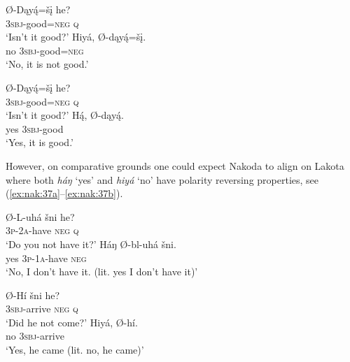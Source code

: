 \documentclass[output=paper,colorlinks,citecolor=brown]{langscibook}
\begin{document}
\ea\label{ex:nak:36a}
    \begin{xlist}[Q: ]
        \gll Ø-Dąy\'{ą}=šį he?  \\
             \textsc{3sbj}-good=\textsc{neg} \textsc{q}  \\
        \glt ‘Isn’t it good?’
        \gll Hiyá, Ø-dąy\'{ą}=šį. \\
              no \textsc{3sbj}-good=\textsc{neg} \\
        \glt ‘No, it is not good.’
    \end{xlist} 
\z 
\ea\label{ex:nak:36b}
    \begin{xlist}[Q: ]
        \gll Ø-Dąy\'{ą}=šį he? \\
             \textsc{3sbj}-good=\textsc{neg} \textsc{q} \\
        \glt ‘Isn’t it good?’
        \gll H\'{ą}, Ø-dąy\'{ą}. \\
              yes \textsc{3sbj}-good\\
        \glt ‘Yes, it is good.’
    \end{xlist}
\z 

However, on comparative grounds one could expect Nakoda to align on Lakota where both \textit{háŋ} ‘yes’ and \textit{hiyá} ‘no’ have polarity reversing properties, see (\ref{ex:nak:37a}--\ref{ex:nak:37b}).

\ea\label{ex:nak:37a}
    \begin{xlist}[Q: ]
        \gll Ø-L-uhá šni he?   \\
            \textsc{3p-2a}-have \textsc{neg} \textsc{q}  \\
        \glt ‘Do you not have it?’ 
        \gll Háŋ Ø-bl-uhá šni.  \\
             yes \textsc{3p-1a}-have \textsc{neg} \\
        \glt ‘No, I don’t have it. (lit. yes I don’t have it)’ 
    \end{xlist}
\z
\ea\label{ex:nak:37b}
    \begin{xlist}[Q: ]
        \gll Ø-Hí šni he?   \\
            \textsc{3sbj}-arrive \textsc{neg} \textsc{q} \\
        \glt ‘Did he not come?’ 
        \gll Hiyá, Ø-hí.  \\
            no \textsc{3sbj}-arrive\\
        \glt ‘Yes, he came (lit. no, he came)’ 
    \end{xlist}
\z 
\end{document}
